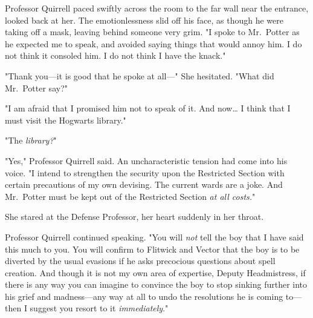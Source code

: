 Professor Quirrell paced swiftly across the room to the far wall near the
entrance, looked back at her. The emotionlessness slid off his face, as though
he were taking off a mask, leaving behind someone very grim. "I spoke to
Mr.~Potter as he expected me to speak, and avoided saying things that would
annoy him. I do not think it consoled him. I do not think I have the knack."

"Thank you---it is good that he spoke at all---" She hesitated. "What did
Mr.~Potter say?"

"I am afraid that I promised him not to speak of it. And now{\ldots} I think
that I must visit the Hogwarts library."

"The \emph{library?}"

"Yes," Professor Quirrell said. An uncharacteristic tension had come into his
voice. "I intend to strengthen the security upon the Restricted Section with
certain precautions of my own devising. The current wards are a joke. And
Mr.~Potter must be kept out of the Restricted Section \emph{at all costs.}"

She stared at the Defense Professor, her heart suddenly in her throat.

Professor Quirrell continued speaking. "You will \emph{not} tell the boy that I
have said this much to you. You will confirm to Flitwick and Vector that the
boy is to be diverted by the usual evasions if he asks precocious questions
about spell creation. And though it is not my own area of expertise, Deputy
Headmistress, if there is any way you can imagine to convince the boy to stop
sinking further into his grief and madness---any way at all to undo the
resolutions he is coming to---then I suggest you resort to it
\emph{immediately}."
